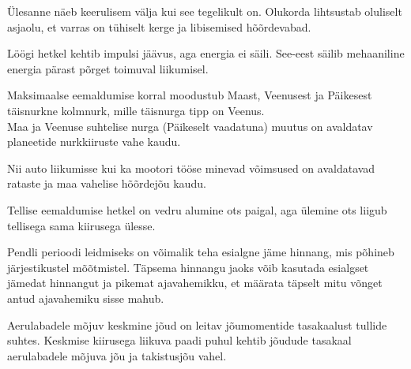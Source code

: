 \documentclass[10pt, twoside]{article}
\begin{document}
{
\hint
Ülesanne näeb keerulisem välja kui see tegelikult on. Olukorda lihtsustab oluliselt asjaolu, et varras on tühiselt kerge ja libisemised hõõrdevabad.
\probend
\bigskip


\hint
Löögi hetkel kehtib impulsi jäävus, aga energia ei säili. See-eest säilib mehaaniline energia pärast põrget toimuval liikumisel.
\probend
\bigskip


\hint
\osa Maksimaalse eemaldumise korral moodustub Maast, Veenusest ja Päikesest täisnurkne kolmnurk, mille täisnurga tipp on Veenus.\\
\osa Maa ja Veenuse suhtelise nurga (Päikeselt vaadatuna) muutus on avaldatav planeetide nurkkiiruste vahe kaudu.
\probend
\bigskip


\hint
Nii auto liikumisse kui ka mootori tööse minevad võimsused on avaldatavad rataste ja maa vahelise hõõrdejõu kaudu.
\probend
\bigskip


\hint
Tellise eemaldumise hetkel on vedru alumine ots paigal, aga ülemine ots liigub tellisega sama kiirusega ülesse.
\probend
\bigskip


\hint
Pendli perioodi leidmiseks on võimalik teha esialgne jäme hinnang, mis põhineb järjestikustel mõõtmistel. Täpsema hinnangu jaoks võib kasutada esialgset jämedat hinnangut ja pikemat ajavahemikku, et määrata täpselt mitu võnget antud ajavahemiku sisse mahub.
\probend
\bigskip


\hint
Aerulabadele mõjuv keskmine jõud on leitav jõumomentide tasakaalust tullide suhtes. Keskmise kiirusega liikuva paadi puhul kehtib jõudude tasakaal aerulabadele mõjuva jõu ja takistusjõu vahel.
\probend
\bigskip

}
\end{document}
